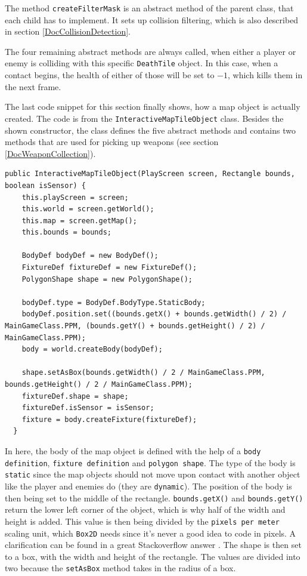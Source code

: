 \documentclass[12p]{article}
\begin{document}
The method \texttt{createFilterMask} is an abstract method of the parent class, that each child has to implement. It sets up collision filtering, which is also described in section \ref{DocCollisionDetection}.

The four remaining abstract methods are always called, when either a player or enemy is colliding with this specific \texttt{DeathTile} object. In this case, when a contact begins, the health of either of those will be set to $-1$, which kills them in the next frame.

The last code snippet for this section finally shows, how a map object is actually created. The code is from the \texttt{InteractiveMapTileObject} class. Besides the shown constructor, the class defines the five abstract methods and contains two methods that are used for picking up weapons (see section \ref{DocWeaponCollection}).

\begin{verbatim}
public InteractiveMapTileObject(PlayScreen screen, Rectangle bounds, boolean isSensor) {
    this.playScreen = screen;
    this.world = screen.getWorld();
    this.map = screen.getMap();
    this.bounds = bounds;

    BodyDef bodyDef = new BodyDef();
    FixtureDef fixtureDef = new FixtureDef();
    PolygonShape shape = new PolygonShape();

    bodyDef.type = BodyDef.BodyType.StaticBody;
    bodyDef.position.set((bounds.getX() + bounds.getWidth() / 2) / MainGameClass.PPM, (bounds.getY() + bounds.getHeight() / 2) / MainGameClass.PPM);
    body = world.createBody(bodyDef);

    shape.setAsBox(bounds.getWidth() / 2 / MainGameClass.PPM, bounds.getHeight() / 2 / MainGameClass.PPM);
    fixtureDef.shape = shape;
    fixtureDef.isSensor = isSensor;
    fixture = body.createFixture(fixtureDef);
  }
\end{verbatim}

In here, the body of the map object is defined with the help of a \texttt{body definition}, \texttt{fixture definition} and \texttt{polygon shape}. The type of the body is \texttt{static} since the map objects should not move upon contact with another object like the player and enemies do (they are \texttt{dynamic}). The position of the body is then being set to the middle of the rectangle. \texttt{bounds.getX()} and \texttt{bounds.getY()} return the lower left corner of the object, which is why half of the width and height is added. This value is then being divided by the \texttt{pixels per meter} scaling unit, which \texttt{Box2D} needs since it's never a good idea to code in pixels. A clarification can be found in a great Stackoverflow answer \cite{stackoverflowPPM}. The shape is then set to a box, with the width and height of the rectangle. The values are divided into two because the \texttt{setAsBox} method takes in the radius of a box.
\end{document}
